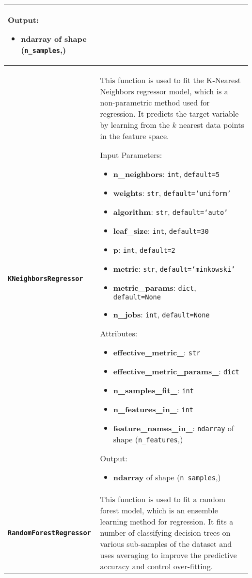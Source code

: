 \begin{longtable}{|l|p{12cm}|}
    Output:
    \begin{itemize}
        \item \textbf{ndarray} of shape (\texttt{n\_samples},)
    \end{itemize} \\*
    \hline
    \textbf{\texttt{KNeighborsRegressor}} &
	This function is used to fit the K-Nearest Neighbors regressor model, which is a non-parametric method used for regression. It predicts the target variable by learning from the $k$ nearest data points in the feature space.

	Input Parameters:
	\begin{itemize}
		\item \textbf{n\_neighbors}: \texttt{int}, \texttt{default=5}
		\item \textbf{weights}: \texttt{str}, \texttt{default=`uniform'}
		\item \textbf{algorithm}: \texttt{str}, \texttt{default=`auto'}
		\item \textbf{leaf\_size}: \texttt{int}, \texttt{default=30}
		\item \textbf{p}: \texttt{int}, \texttt{default=2}
		\item \textbf{metric}: \texttt{str}, \texttt{default=`minkowski'}
		\item \textbf{metric\_params}: \texttt{dict}, \texttt{default=None}
		\item \textbf{n\_jobs}: \texttt{int}, \texttt{default=None}
	\end{itemize}

	Attributes:
	\begin{itemize}
		\item \textbf{effective\_metric\_}: \texttt{str}
		\item \textbf{effective\_metric\_params\_}: \texttt{dict}
		\item \textbf{n\_samples\_fit\_}: \texttt{int}
		\item \textbf{n\_features\_in\_}: \texttt{int}
		\item \textbf{feature\_names\_in\_}: \texttt{ndarray} of shape (\texttt{n\_features},)
	\end{itemize}

	Output:
	\begin{itemize}
		\item \textbf{ndarray} of shape (\texttt{n\_samples},)
	\end{itemize} \\*
	\hline
    \nopagebreak
    \textbf{\texttt{RandomForestRegressor}} &
    This function is used to fit a random forest model, which is an ensemble learning method for regression. It fits a number of classifying decision trees on various sub-samples of the dataset and uses averaging to improve the predictive accuracy and control over-fitting.


\end{longtable}
